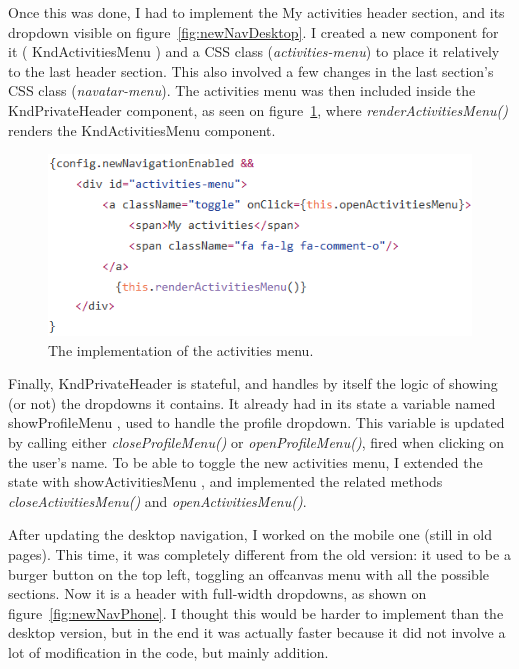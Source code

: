 Once this was done, I had to implement the \guillemotleft{} My activities \guillemotright{} header section, and its dropdown visible on {\sc figure}~\ref{fig:newNavDesktop}. I created a new component for it (\guillemotleft{} KndActivitiesMenu \guillemotright{}) and a CSS class (\textit{activities-menu}) to place it relatively to the last header section. This also involved a few changes in the last section's CSS class (\textit{navatar-menu}). The activities menu was then included inside the \guillemotleft{} KndPrivateHeader \guillemotright{} component, as seen on {\sc figure}~\ref{fig:activitiesImpl}, where \textit{renderActivitiesMenu()} renders the KndActivitiesMenu component.

\begin{figure}[H]
    \centering
    \includegraphics[scale=0.9]{figure/activitiesImpl.png}
    \caption{The implementation of the activities menu.}
    \label{fig:activitiesImpl}
\end{figure}

Finally, KndPrivateHeader is stateful, and handles by itself the logic of showing (or not) the dropdowns it contains. It already had in its state a variable named \guillemotleft{} showProfileMenu \guillemotright{}, used to handle the profile dropdown. This variable is updated by calling either \textit{closeProfileMenu()} or \textit{openProfileMenu()}, fired when clicking on the user's name. To be able to toggle the new activities menu, I extended the state with \guillemotleft{} showActivitiesMenu \guillemotright{}, and implemented the related methods \textit{closeActivitiesMenu()} and \textit{openActivitiesMenu()}.

After updating the desktop navigation, I worked on the mobile one (still in old pages). This time, it was completely different from the old version: it used to be a burger button on the top left, toggling an offcanvas menu with all the possible sections. Now it is a header with full-width dropdowns, as shown on {\sc figure}~\ref{fig:newNavPhone}. I thought this would be harder to implement than the desktop version, but in the end it was actually faster because it did not involve a lot of modification in the code, but mainly addition.

